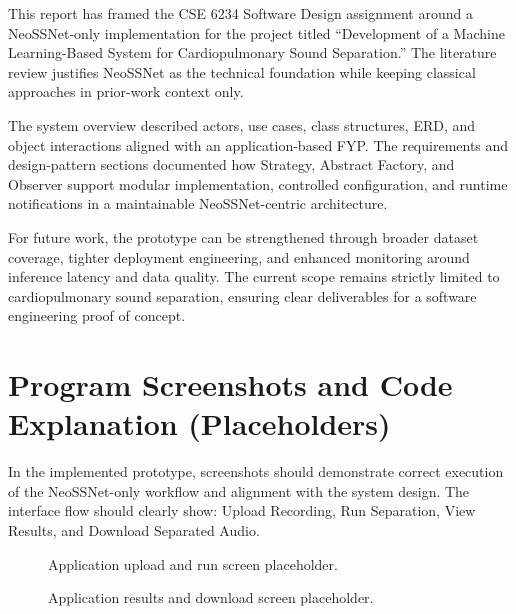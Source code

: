 \documentclass[12pt,a4paper]{report}
\begin{document}
This report has framed the CSE 6234 Software Design assignment around a NeoSSNet-only implementation for the project titled ``Development of a Machine Learning-Based System for Cardiopulmonary Sound Separation.'' The literature review justifies NeoSSNet as the technical foundation while keeping classical approaches in prior-work context only.\citep{poh2024neossnet,zhao2024deep,sun2024review}

The system overview described actors, use cases, class structures, ERD, and object interactions aligned with an application-based FYP. The requirements and design-pattern sections documented how Strategy, Abstract Factory, and Observer support modular implementation, controlled configuration, and runtime notifications in a maintainable NeoSSNet-centric architecture.

For future work, the prototype can be strengthened through broader dataset coverage, tighter deployment engineering, and enhanced monitoring around inference latency and data quality. The current scope remains strictly limited to cardiopulmonary sound separation, ensuring clear deliverables for a software engineering proof of concept.

\section*{Program Screenshots and Code Explanation (Placeholders)}

In the implemented prototype, screenshots should demonstrate correct execution of the NeoSSNet-only workflow and alignment with the system design. The interface flow should clearly show: Upload Recording, Run Separation, View Results, and Download Separated Audio.

\begin{figure}[h]
  \centering
  \caption{Application upload and run screen placeholder.}
\end{figure}

\begin{figure}[h]
  \centering
  \caption{Application results and download screen placeholder.}
\end{figure}
\end{document}
